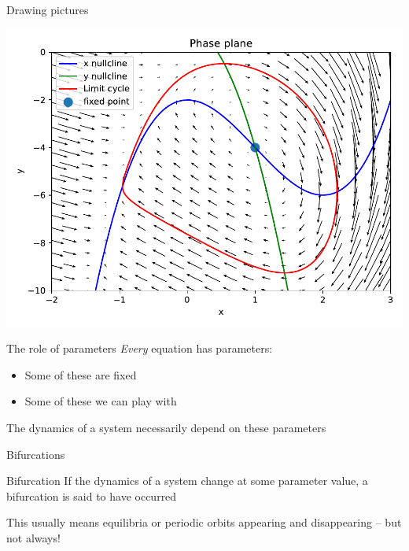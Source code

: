 \documentclass[presentation]{beamer}
\begin{document}
\begin{frame}[label={sec:org5478950}]{Drawing pictures}
\begin{center}
\includegraphics[height=.9\textheight]{./phaseplane.pdf}
\end{center}
\end{frame}

\begin{frame}[label={sec:org6511a4c}]{The role of parameters}
\emph{Every} equation has parameters:
\begin{itemize}
\item Some of these are fixed
\item Some of these we can play with
\end{itemize}

The dynamics of a system necessarily depend on these parameters
\end{frame}

\begin{frame}[label={sec:orga611aa3}]{Bifurcations}
\begin{block}{Bifurcation}
If the dynamics of a system change at some parameter value, a bifurcation is said to have occurred
\end{block}
\vfill

This usually means equilibria or periodic orbits appearing and disappearing -- but not always!
\end{frame}
\end{document}
